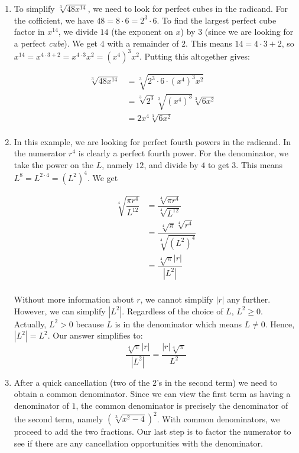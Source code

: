\begin{ex}
\begin{enumerate}
\item  To simplify $\sqrt[3]{48x^{14}}$, we need to look for perfect cubes in the radicand.  For the cofficient, we have $48 = 8 \cdot 6 = 2^3 \cdot 6$.  To find the largest perfect cube factor in $x^{14}$, we divide $14$ (the exponent on $x$) by $3$ (since we are looking for a perfect \textit{cube}).  We get $4$ with a remainder of $2$.  This means $14 = 4 \cdot 3 + 2$, so $x^{14} = x^{4 \cdot 3 + 2} = x^{4 \cdot 3} x^2 = (x^4)^3 x^2$.  Putting this altogether gives:

\begin{align*}
\sqrt[3]{48x^{14}} & = \sqrt[3]{2^3 \cdot 6 \cdot(x^4)^3 x^2} \tag{Factor out perfect cubes} \\
& = \sqrt[3]{2^3} \sqrt[3]{(x^4)^3} \sqrt[3]{6x^2} \tag{Rearrange factors,  Product Rule of Radicals} \\
& = 2x^4\sqrt[3]{6x^2} & \\
\end{align*}

\item  In this example, we are looking for perfect fourth powers in the radicand.  In the numerator $r^4$ is clearly a perfect fourth power.  For the denominator, we take the power on the $L$, namely $12$, and divide by $4$ to get $3$.  This means $L^{8} = L^{2\cdot 4} = (L^2)^{4}$.  We get 

\begin{align*}
\sqrt[4]{\dfrac{\pi r^{4}}{L^{12}}} & = \dfrac{\sqrt[4]{\pi r^{4}}}{\sqrt[4]{L^{12}}} \tag{Quotient Rule of Radicals} \\ 
& = \dfrac{\sqrt[4]{\pi}\sqrt[4]{r^{4}}}{\sqrt[4]{(L^2)^{4}}} \tag{Product Rule of Radicals} \\ 
& = \dfrac{\sqrt[4]{\pi}|r|}{|L^2|} \tag{Simplify} \\
\end{align*}

Without more information about $r$, we cannot simplify $|r|$ any further.  However, we can simplify $|L^2|$.  Regardless of the choice of $L$, $L^2 \geq 0$. Actually, $L^2 > 0$ because $L$ is in the denominator which means $L \neq 0$. Hence, $|L^2| = L^2$.  Our answer simplifies to: \[ \dfrac{\sqrt[4]{\pi}|r|}{|L^2|} = \dfrac{|r|\sqrt[4]{\pi}}{L^2} \]

\item After a quick cancellation (two of the $2$'s in the second term) we need to obtain a common denominator.  Since we can view the first term as having a denominator of $1$,  the common denominator is precisely the denominator of the second term, namely $(\sqrt[3]{x^2-4})^2$.  With common denominators, we proceed to add the two fractions.  Our last step is to factor the numerator to see if there are any cancellation opportunities with the denominator.


\end{enumerate}
\end{ex}
